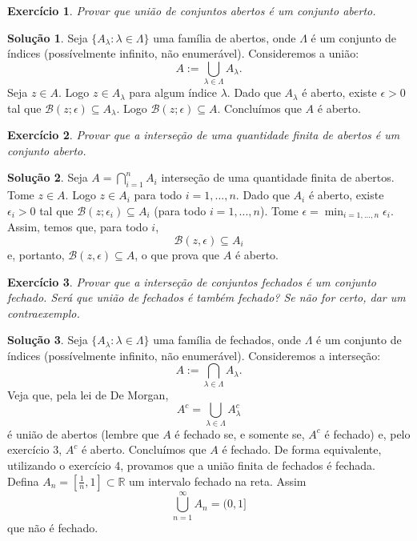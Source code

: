 \documentclass[a4paper,12pt]{article}
\newcommand{\R}{\mathbb{R}}
\newcommand{\B}{\mathcal{B}}
\theoremstyle{exer}
\newtheorem{exercise}{Exercício}
\theoremstyle{definition}
\newtheorem{solution}{Solução}
\theoremstyle{plain}
\begin{document}
\begin{exercise}
    Provar que união de conjuntos abertos é um conjunto aberto.
\end{exercise}

\begin{solution}
    Seja $\{A_{\lambda} : \lambda \in \Lambda\}$ uma família de abertos, onde
    $\Lambda$ é um conjunto de índices (possívelmente infinito, não
    enumerável). Consideremos a união:
    $$
    A := \bigcup_{\lambda \in \Lambda} A_{\lambda}.
    $$
    Seja $z \in A$. Logo $z \in A_{\lambda}$ para algum índice $\lambda$. Dado
    que $A_{\lambda}$ é aberto, existe $\epsilon > 0$ tal que $\B(z; \epsilon)
    \subseteq A_{\lambda}$. Logo $\B(z; \epsilon) \subseteq A$. Concluímos que $A$ é aberto.
\end{solution}

\begin{exercise}
    Provar que a interseção de uma quantidade finita de abertos é um conjunto aberto.
\end{exercise}

\begin{solution}
    Seja $A = \bigcap_{i=1}^n A_i$ interseção de uma quantidade finita de
    abertos. Tome $z \in A$. Logo $z \in A_i$ para todo $i=1,...,n$. Dado que $A_i$ é aberto, existe $\epsilon_i > 0$ tal que $\B(z; \epsilon_i)
    \subseteq A_i$ (para todo $i=1,...,n$). Tome $\epsilon = \min_{i=1,...,n}
    \epsilon_i$. Assim, temos que, para todo $i$, 
    $$
    \B(z, \epsilon) \subseteq A_i
    $$
    e, portanto, $\B(z, \epsilon) \subseteq A$, o que prova que $A$ é aberto.
\end{solution}

\begin{exercise}
    Provar que a interseção de conjuntos fechados é um conjunto fechado. Será que união de fechados é também fechado? Se não for certo, dar um contraexemplo.
\end{exercise}

\begin{solution}
    Seja $\{A_{\lambda} : \lambda \in \Lambda\}$ uma família de fechados, onde
    $\Lambda$ é um conjunto de índices (possívelmente infinito, não
    enumerável). Consideremos a interseção:
    $$
    A := \bigcap_{\lambda \in \Lambda} A_{\lambda}.
    $$
    Veja que, pela lei de De Morgan,
    $$
    A^c = \bigcup_{\lambda \in \Lambda} A_{\lambda}^c
    $$
    é união de abertos (lembre que $A$ é fechado se, e somente se, $A^c$ é
    fechado) e, pelo exercício 3, $A^c$ é aberto. Concluímos que $A$ é
    fechado. De forma equivalente, utilizando o exercício 4, provamos que a
    união finita de fechados é fechada. Defina $A_n = \left[\frac{1}{n}, 1\right] \subset \R$ um intervalo fechado
    na reta. Assim 
    $$
    \bigcup_{n=1}^{\infty} A_n = (0,1]
    $$
    que não é fechado. 
\end{solution}
\end{document}
